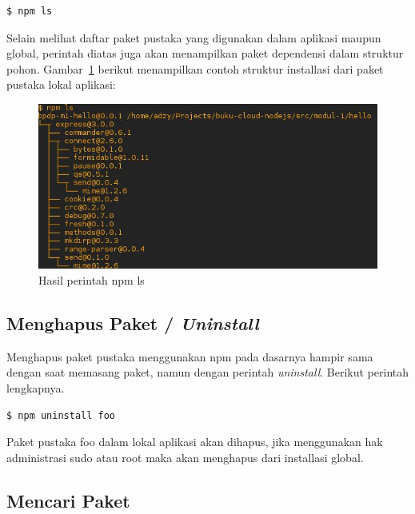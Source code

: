 \lstset{language=bash,caption=Argumen npm untuk melihat daftar paket terpasang}
\begin{lstlisting}
$ npm ls
\end{lstlisting}

Selain melihat daftar paket pustaka yang digunakan dalam aplikasi maupun global, perintah diatas juga akan menampilkan paket dependensi dalam struktur pohon. Gambar~\ref{fig:npmls} berikut menampilkan contoh struktur installasi dari paket pustaka lokal aplikasi:

  \begin{figure}
    \begin{center}
      \includegraphics[scale=0.5]{images/npmls.jpg}
    \end{center}
    \caption{Hasil perintah npm ls}
    \label{fig:npmls}
  \end{figure}

\subsection{Menghapus Paket / \textit{Uninstall}}

Menghapus paket pustaka menggunakan npm pada dasarnya hampir sama dengan saat memasang paket, namun dengan perintah \textit{uninstall}. Berikut perintah lengkapnya.

\lstset{language=bash,caption=Perintah menghapus paket di npm}
\begin{lstlisting}
$ npm uninstall foo
\end{lstlisting}

Paket pustaka foo dalam lokal aplikasi akan dihapus, jika menggunakan hak administrasi sudo atau root maka akan menghapus dari installasi global.

\subsection{Mencari Paket}


